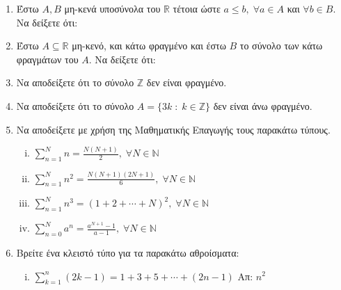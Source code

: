 \begin{enumerate}
    \item Έστω $ A, B $ μη-κενά υποσύνολα του $ \mathbb{R} $ τέτοια ώστε 
      $ a \leq b, \; \forall a \in A $ και $ \forall b \in B $.
      Να δείξετε ότι:

    \item Έστω $ A \subseteq \mathbb{R} $ μη-κενό, και κάτω φραγμένο και έστω 
      $ B $ το σύνολο των κάτω φραγμάτων του $A$. Να δείξετε ότι:
      
    \item Να αποδείξετε ότι το σύνολο $ \mathbb{Z} $ δεν είναι φραγμένο.

    \item \label{ask:3z} Να αποδείξετε ότι το σύνολο 
      $ A = \{ 3k \; : \; k \in \mathbb{Z} \} $ δεν είναι άνω φραγμένο.

    \item Να αποδείξετε με χρήση της Μαθηματικής Επαγωγής τους παρακάτω τύπους.
      \label{eq:epagsums}
      \begin{enumerate}[i)]
        \item $ \sum_{n=1}^{N} n = \frac{N(N+1)}{2},\; \forall N \in
          \mathbb{N} $
        \item $ \sum_{n=1}^{N} n^{2} = \frac{N(N+1)(2N+1)}{6},\; \forall 
          N \in \mathbb{N} $
        \item $ \sum_{n=1}^{N} n^{3} = (1+2+\cdots + N)^{2}, \; 
          \forall N \in \mathbb{N} $
        \item $ \sum_{n=0}^{N} a^{n} = \frac{a^{N+1} - 1}{a-1},\; 
          \forall N \in \mathbb{N}$
      \end{enumerate}

    \item \label{ask:sums} Βρείτε ένα κλειστό τύπο για τα παρακάτω 
      αθροίσματα: 
      \begin{enumerate}[i)]
        \item $ \sum_{k=1}^{n} (2k-1) = 1 + 3 + 5 + \cdots + (2n-1)  
          $ \hfill Απ: $ n^{2} $ 


\end{enumerate}
\end{enumerate}
